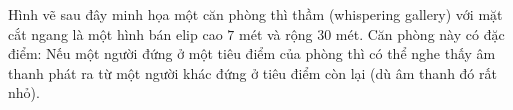 \begin{bt}%
	Hình vẽ sau đây minh họa một căn phòng thì thầm (whispering gallery) với mặt cắt ngang là một hình bán elip cao $7$ mét và rộng $30$ mét. Căn phòng này có đặc điểm: Nếu một người đứng ở một tiêu điểm của phòng thì có thể nghe thấy âm thanh phát ra từ một người khác đứng ở tiêu điểm còn lại (dù âm thanh đó rất nhỏ).
\begin{center}
\end{center}
\end{bt}
